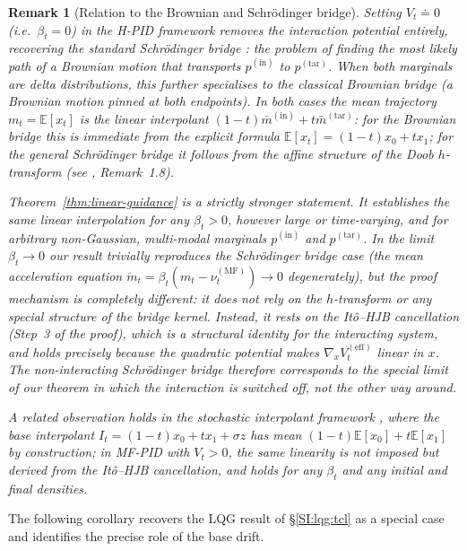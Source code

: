 \documentclass[11pt,onecolumn]{article}
\newcommand{\ptar}{p^{(\mathrm{tar})}}
\newcommand{\pin}{p^{(\mathrm{in})}}
\newcommand{\MF}{\mathrm{MF}}
\newtheorem{remark}{Remark}[section]
\begin{document}
\begin{remark}[Relation to the Brownian and Schr\"{o}dinger bridge]
\label{rem:schrodinger}
Setting $V_t \doteq  0$ (i.e.\ $\beta_t = 0$) in the H-PID framework removes the interaction potential entirely, recovering the standard \emph{Schr\"{o}dinger bridge} \cite{leonard_survey_2013}: the problem of finding the most likely path of a Brownian motion that transports $\pin$ to $\ptar$. When both marginals are delta distributions, this further specialises to the classical \emph{Brownian bridge} (a Brownian motion pinned at both endpoints). In both cases the mean trajectory $m_t = \mathbb{E}[x_t]$ is the linear interpolant $(1{-}t)\bar m^{(\mathrm{in})} + t\bar m^{(\mathrm{tar})}$: for the Brownian bridge this is immediate from the explicit formula $\mathbb{E}[x_t] = (1{-}t)x_0 + t x_1$; for the general Schr\"{o}dinger bridge it follows from the affine structure of the Doob $h$-transform (see \cite{leonard_survey_2013}, Remark~1.8).

Theorem~\ref{thm:linear-guidance} is a strictly stronger statement. It establishes the \emph{same} linear interpolation for \emph{any} $\beta_t > 0$, however large or time-varying, and for arbitrary non-Gaussian, multi-modal marginals $\pin$ and $\ptar$. In the limit $\beta_t \to 0$ our result trivially reproduces the Schr\"{o}dinger bridge case (the mean acceleration equation $\ddot m_t = \beta_t(m_t - \nu_t^{(\MF)}) \to 0$ degenerately), but the proof mechanism is completely different: it does not rely on the $h$-transform or any special structure of the bridge kernel. Instead, it rests on the Itô--HJB cancellation (Step~3 of the proof), which is a structural identity for the \emph{interacting} system, and holds precisely because the quadratic potential makes $\nabla_x V^{(\mathrm{eff})}_t$ linear in $x$. The non-interacting Schr\"{o}dinger bridge therefore corresponds to the special limit of our theorem in which the interaction is switched off, not the other way around.

A related observation holds in the stochastic interpolant framework \cite{albergo_building_2023}, where the base interpolant $I_t=(1-t)x_0+t x_1+\sigma z$ has mean $(1{-}t)\mathbb{E}[x_0]+t\mathbb{E}[x_1]$ by construction; in MF-PID with $V_t>0$, the same linearity is not imposed but \emph{derived} from the Itô--HJB cancellation, and holds for any $\beta_t$ and any initial and final densities.
\end{remark}

The following corollary recovers the LQG result of \S\ref{SI:lqg:tcl} as a special case and identifies the precise role of the base drift.
\end{document}
